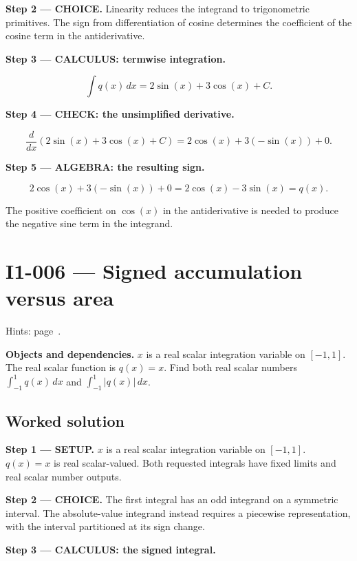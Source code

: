 \documentclass[11pt,oneside,openany]{book}
\begin{document}
\begin{ChoiceStep}
\textbf{Step 2 --- CHOICE.} Linearity reduces the integrand to trigonometric primitives.
The sign from differentiation of cosine determines the coefficient of the
cosine term in the antiderivative.

\end{ChoiceStep}
\textbf{Step 3 --- CALCULUS: termwise integration.}

\[
\int q(x)\,dx=2\sin(x)+3\cos(x)+C.
\]

\textbf{Step 4 --- CHECK: the unsimplified derivative.}

\[
\frac{d}{dx}\left(2\sin(x)+3\cos(x)+C\right)
=2\cos(x)+3(-\sin(x))+0.
\]

\begingroup\color{AlgebraBlue}
\textbf{Step 5 --- ALGEBRA: the resulting sign.}

\[
2\cos(x)+3(-\sin(x))+0=2\cos(x)-3\sin(x)=q(x).
\]

The positive coefficient on \(\cos(x)\) in the antiderivative is needed to
produce the negative sine term in the integrand.
\endgroup
\clearpage
\section{I1-006 --- Signed accumulation versus area}
\label{problem:I1-006}
{\small Hints: page~\pageref{hints:I1-006}.}\par\medskip

\textbf{Objects and dependencies.} \(x\) is a real scalar integration variable on
\([-1,1]\). The real scalar function is \(q(x)=x\). Find both real scalar numbers
\(\int_{-1}^{1}q(x)\,dx\) and \(\int_{-1}^{1}|q(x)|\,dx\).
\subsection*{Worked solution}

\textbf{Step 1 --- SETUP.} \(x\) is a real scalar integration variable on \([-1,1]\).
\(q(x)=x\) is real scalar-valued. Both requested integrals have fixed limits and
real scalar number outputs.

\begin{ChoiceStep}
\textbf{Step 2 --- CHOICE.} The first integral has an odd integrand on a symmetric interval.
The absolute-value integrand instead requires a piecewise representation,
with the interval partitioned at its sign change.

\end{ChoiceStep}
\textbf{Step 3 --- CALCULUS: the signed integral.}
\end{document}
